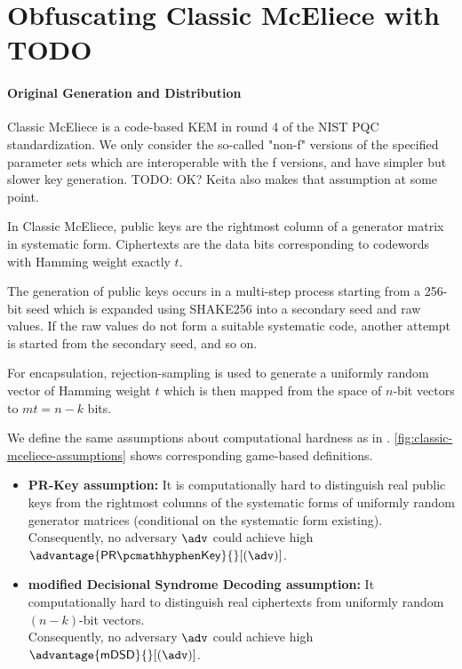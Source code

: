 \section{Obfuscating Classic McEliece with TODO} \label{sec:obfuscating-classic-mceliece}

\paragraph{Original Generation and Distribution}
Classic McEliece \cite{NISTPQC-R4:ClassicMcEliece22} is a code-based KEM in round 4 of the NIST PQC standardization. We only consider the so-called "non-f" versions of the specified parameter sets which are interoperable with the f versions, and have simpler but slower key generation. TODO: OK? Keita also makes that assumption at some point.

In Classic McEliece, public keys are the rightmost column of a generator matrix in systematic form. Ciphertexts are the data bits corresponding to codewords with Hamming weight exactly $t$.

The generation of public keys occurs in a multi-step process starting from a 256-bit seed which is expanded using SHAKE256 into a secondary seed and raw values. If the raw values do not form a suitable systematic code, another attempt is started from the secondary seed, and so on.

For encapsulation, rejection-sampling is used to generate a uniformly random vector of Hamming weight $t$ which is then mapped from the space of $n$-bit vectors to $mt=n-k$ bits.

We define the same assumptions about computational hardness as in \cite[Definition~K.1]{EC:Xagawa22}. \cref{fig:classic-mceliece-assumptions} shows corresponding game-based definitions.
\begin{itemize}
    \item \textbf{PR-Key assumption:} It is computationally hard to distinguish real public keys from the rightmost columns of the systematic forms of uniformly random generator matrices (conditional on the systematic form existing). \\
    Consequently, no adversary $\adv$ could achieve high $ \advantage{\prkey}{}[(\adv)] $.
    \item \textbf{modified Decisional Syndrome Decoding assumption:} It computationally hard to distinguish real ciphertexts from uniformly random $(n-k)$-bit vectors. \\
    Consequently, no adversary $\adv$ could achieve high $ \advantage{\mdsd}{}[(\adv)] $.
\end{itemize}

